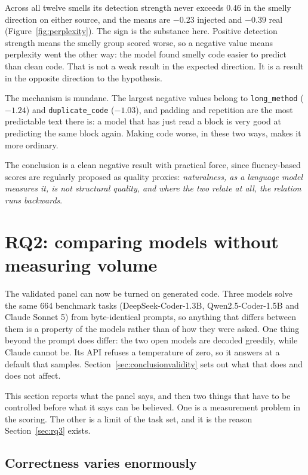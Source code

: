 \documentclass[10pt,a4paper,twocolumn]{article}
\begin{document}
Across all twelve smells its detection strength never exceeds $0.46$ in the
smelly direction on either source, and the means are $-0.23$ injected and
$-0.39$ real (Figure~\ref{fig:perplexity}). The sign is the substance here.
Positive detection strength means the smelly group scored worse, so a negative
value means perplexity went the other way: the model found smelly code easier to predict than clean code. That is not a weak result in the
expected direction. It is a result in the opposite direction to the hypothesis.

The mechanism is mundane. The largest negative values belong to \texttt{long\_method} ($-1.24$) and
\texttt{duplicate\_code} ($-1.03$), and padding and repetition are the most
predictable text there is: a model that has just read a block is very good at
predicting the same block again. Making code worse, in these two ways, makes it
more ordinary.

The conclusion is a clean negative result with practical force, since
fluency-based scores are regularly proposed as quality proxies:
\emph{naturalness, as a language model measures it, is not structural quality,
and where the two relate at all, the relation runs backwards}.

\section{RQ2: comparing models without measuring volume}
\label{sec:rq2}

The validated panel can now be turned on generated code. Three models solve the
same 664 benchmark tasks (DeepSeek-Coder-1.3B, Qwen2.5-Coder-1.5B and Claude
Sonnet 5) from byte-identical prompts, so anything that differs between them is
a property of the models rather than of how they were asked. One thing beyond
the prompt does differ: the two open models are decoded greedily, while Claude
cannot be. Its API refuses a temperature of zero, so it answers at a default
that samples. Section~\ref{sec:conclusionvalidity} sets out what that does and
does not affect.

This section reports what the panel says, and then two things that have to be
controlled before what it says can be believed. One is a measurement problem in
the scoring. The other is a limit of the task set, and it is the reason
Section~\ref{sec:rq3} exists.

\subsection{Correctness varies enormously}
\end{document}
